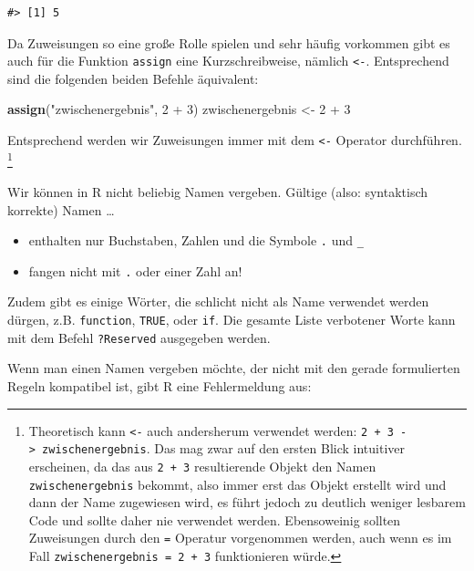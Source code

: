 \documentclass[]{tufte-book}
\newenvironment{Shaded}{}{}
\newcommand{\KeywordTok}[1]{\textcolor[rgb]{0.00,0.44,0.13}{\textbf{#1}}}
\newcommand{\DecValTok}[1]{\textcolor[rgb]{0.25,0.63,0.44}{#1}}
\newcommand{\StringTok}[1]{\textcolor[rgb]{0.25,0.44,0.63}{#1}}
\newcommand{\OperatorTok}[1]{\textcolor[rgb]{0.40,0.40,0.40}{#1}}
\newcommand{\NormalTok}[1]{#1}
\providecommand{\tightlist}{%
  \setlength{\itemsep}{0pt}\setlength{\parskip}{0pt}}
\begin{document}
\begin{verbatim}
#> [1] 5
\end{verbatim}

Da Zuweisungen so eine große Rolle spielen und sehr häufig vorkommen
gibt es auch für die Funktion \texttt{assign} eine Kurzschreibweise,
nämlich \texttt{\textless{}-}. Entsprechend sind die folgenden beiden
Befehle äquivalent:

\begin{Shaded}
\begin{Highlighting}[]
\KeywordTok{assign}\NormalTok{(}\StringTok{"zwischenergebnis"}\NormalTok{, }\DecValTok{2} \OperatorTok{+}\StringTok{ }\DecValTok{3}\NormalTok{)}
\NormalTok{zwischenergebnis <-}\StringTok{ }\DecValTok{2} \OperatorTok{+}\StringTok{ }\DecValTok{3}
\end{Highlighting}
\end{Shaded}

Entsprechend werden wir Zuweisungen immer mit dem \texttt{\textless{}-}
Operator durchführen. \footnote{Theoretisch kann \texttt{\textless{}-}
  auch andersherum verwendet werden:
  \texttt{2\ +\ 3\ -\textgreater{}\ zwischenergebnis}. Das mag zwar auf
  den ersten Blick intuitiver erscheinen, da das aus \texttt{2\ +\ 3}
  resultierende Objekt den Namen \texttt{zwischenergebnis} bekommt, also
  immer erst das Objekt erstellt wird und dann der Name zugewiesen wird,
  es führt jedoch zu deutlich weniger lesbarem Code und sollte daher nie
  verwendet werden. Ebensoweinig sollten Zuweisungen durch den
  \texttt{=} Operatur vorgenommen werden, auch wenn es im Fall
  \texttt{zwischenergebnis\ =\ 2\ +\ 3} funktionieren würde.}

Wir können in R nicht beliebig Namen vergeben. Gültige (also:
syntaktisch korrekte) Namen \ldots{}

\begin{itemize}
\tightlist
\item
  enthalten nur Buchstaben, Zahlen und die Symbole \texttt{.} und
  \texttt{\_}
\item
  fangen nicht mit \texttt{.} oder einer Zahl an!
\end{itemize}

Zudem gibt es einige Wörter, die schlicht nicht als Name verwendet
werden dürgen, z.B. \texttt{function}, \texttt{TRUE}, oder \texttt{if}.
Die gesamte Liste verbotener Worte kann mit dem Befehl
\texttt{?Reserved} ausgegeben werden.

Wenn man einen Namen vergeben möchte, der nicht mit den gerade
formulierten Regeln kompatibel ist, gibt R eine Fehlermeldung aus:
\end{document}
